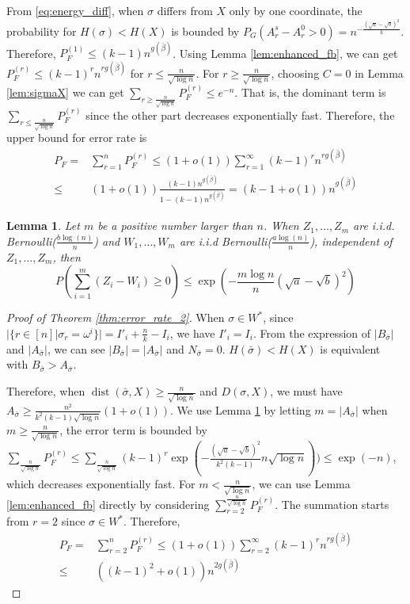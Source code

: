 \documentclass[journal]{IEEEtran}
\newtheorem{lemma}{Lemma}
\newcommand{\A}{\frac{a \log(n)}{n}}
\newcommand{\B}{\frac{b \log(n)}{n}}
\newcommand{\1}{\mathbbm{1}}
\DeclareMathOperator{\dist}{dist}
\begin{document}
From \eqref{eq:energy_diff}, when $\sigma$ differs from $X$ only by one coordinate, the probability for $H(\sigma) < H(X)$ is
bounded by $P_G(A_r^s - A_r^0 > 0) = n^{-\frac{(\sqrt{a}-\sqrt{b})^2}{k}}$. Therefore, $P_F^{(1)}  \leq (k-1)n^{g(\bar{\beta})}$.
Using Lemma \ref{lem:enhanced_fb}, we can get $P_F^{(r)} \leq (k-1)^r n^{rg(\bar{\beta})}$ for $ r \leq \frac{n}{\sqrt{\log n}}$.
For $ r \geq \frac{n}{\sqrt{\log n}}$, choosing $C=0$ in Lemma \ref{lem:sigmaX} we can get $\sum_{r\geq \frac{n}{\sqrt{\log n}}}P_F^{(r)} \leq e^{-n}$.
That is, the dominant term is $\sum_{r\leq \frac{n}{\sqrt{\log n}}}P_F^{(r)}$ since the other part decreases exponentially fast.
Therefore, the upper bound for error rate is
\begin{align*}
P_F = & \sum_{r=1}^n P_F^{(r)} \leq (1+o(1)) \sum_{r=1}^{\infty} (k-1)^r n^{rg(\bar{\beta})}\\
 \leq & (1+o(1))\frac{(k-1) n^{g(\bar{\beta})}}{1-(k-1) n^{g(\bar{\beta})}} = (k-1+o(1))n^{g(\bar{\beta})}
\end{align*}
\begin{lemma}\label{lem:mZW}
	Let $m$ be a positive number larger than $n$.
	When $Z_1, \dots, Z_m$ are i.i.d. Bernoulli($\B$) and $W_1, \dots, W_m$ are i.i.d Bernoulli($\A$), independent of $Z_1, \dots, Z_m$,
	then
	\begin{equation}
	P(\sum_{i=1}^m (Z_i  - W_i) \geq 0) \leq \exp(-\frac{m \log n}{n}(\sqrt{a} - \sqrt{b})^2)
	\end{equation}
\end{lemma}
\begin{proof}[Proof of Theorem \ref{thm:error_rate_2}]
When $\sigma \in W^*$, since $|\{r\in [n] | \sigma_r = \omega^i \}| = I'_i + \frac{n}{k} - I_i $, we have $I'_i = I_i$.
From the expression of $|B_{\bar{\sigma}}|$ and $|A_{\bar{\sigma}}|$, we can see  $|B_{\bar{\sigma}}| = |A_{\bar{\sigma}}|$
and $N_{\bar{\sigma}} = 0$. $H(\bar{\sigma}) < H(X)$ is equivalent with $B_{\bar{\sigma}} > A_{\bar{\sigma}}$.

Therefore, when $ \dist(\bar{\sigma}, X) \geq \frac{n}{\sqrt{\log n} }$ and $D(\sigma, X)$,
we must have $A_{\bar{\sigma}} \geq \frac{n^2}{k^2(k-1)\sqrt{\log n} } (1+o(1))$.
We use Lemma \ref{lem:mZW} by letting $m=|A_{\bar{\sigma}}|$ when $m \geq \frac{n}{ \sqrt{\log n}}$, the error term is bounded
by $\sum_{\frac{n}{ \sqrt{\log n}}} P_F^{(r)} \leq \sum_{\frac{n}{ \sqrt{\log n}}} (k-1)^r \exp(-\frac{(\sqrt{a} - \sqrt{b})^2}{k^2(k-1)} n \sqrt{\log n}))
\leq \exp(-n)$, which decreases exponentially fast.
For $m < \frac{n}{ \sqrt{\log n}}$, we can use Lemma \ref{lem:enhanced_fb} directly 
by considering $\sum_{r=2}^{\frac{n}{ \sqrt{\log n}}} P_F^{(r)}$. The summation starts from $r=2$ since $\sigma \in W^*$.
Therefore,
\begin{align*}
P_F = & \sum_{r=2}^n P_F^{(r)} \leq (1+o(1)) \sum_{r=2}^{\infty} (k-1)^r n^{rg(\bar{\beta})}\\
\leq & ((k-1)^2+o(1))n^{2g(\bar{\beta})}
\end{align*}
\end{proof}
\end{document}
